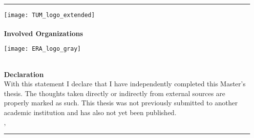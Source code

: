 \thispagestyle{empty}
\ \\[-2cm]
\rule{8mm}{0pt}
\hspace*{10.3cm}
\texttt{[image: TUM\_logo\_extended]}
\\
\ \\[1ex]
\singlespacing\noindent%
{{\huge\textbf{Involved Organizations}}}\\[5ex]
\parbox[c]{2.5cm}{\texttt{[image: ERA\_logo\_gray]}}%
\parbox[c]{13.5cm}{\AdresseLehrstuhl}
\\[10ex]
{{\huge\textbf{Declaration}}}\\[5ex]
With this statement I declare that I have independently completed this Master's thesis. The thoughts taken directly or indirectly from external sources are properly marked as such. This thesis was not previously submitted to another academic institution and has also not yet been published. \\[3ex]
\DAort, \DAabgabe\\[-4ex]
\begin{flushright}{\rule{7cm}{0.5pt}}\\{\footnotesize{\DAautor}}\end{flushright}
\ \\\vfill\noindent
\DAautor\\
\DAautorAnschrift

\cleardoublepage